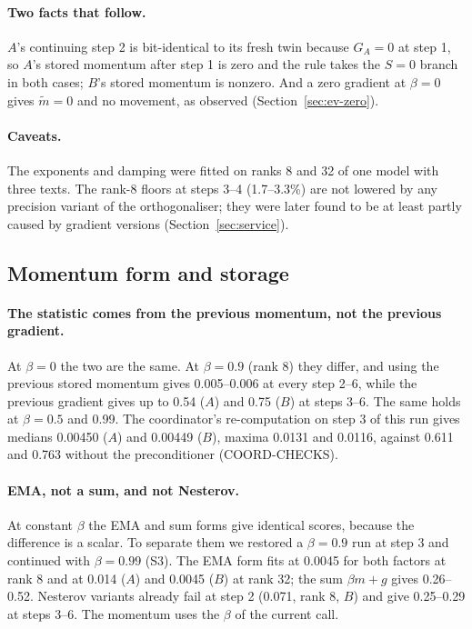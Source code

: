 \documentclass[11pt]{article}
\begin{document}
\paragraph{Two facts that follow.} $A$'s continuing step 2 is bit-identical to its fresh twin
because $G_A=0$ at step 1, so $A$'s stored momentum after step 1 is zero and the rule takes the
$S=0$ branch in both cases; $B$'s stored momentum is nonzero. And a zero gradient at $\beta=0$ gives
$\tilde m=0$ and no movement, as observed (Section~\ref{sec:ev-zero}).

\paragraph{Caveats.} The exponents and damping were fitted on ranks 8 and 32 of one model with three
texts. The rank-8 floors at steps 3--4 (1.7--3.3\%) are not lowered by any precision variant of the
orthogonaliser; they were later found to be at least partly caused by gradient versions
(Section~\ref{sec:service}).

\subsection{Momentum form and storage}\label{sec:ev-mom}
\paragraph{The statistic comes from the previous momentum, not the previous gradient.} At
$\beta=0$ the two are the same. At $\beta=0.9$ (rank 8) they differ, and using the previous stored
momentum gives 0.005--0.006 at every step 2--6, while the previous gradient gives up to 0.54 ($A$)
and 0.75 ($B$) at steps 3--6. The same holds at $\beta=0.5$ and 0.99. The coordinator's
re-computation on step 3 of this run gives medians 0.00450 ($A$) and 0.00449 ($B$), maxima 0.0131 and
0.0116, against 0.611 and 0.763 without the preconditioner (COORD-CHECKS).

\paragraph{EMA, not a sum, and not Nesterov.} At constant $\beta$ the EMA and sum forms give
identical scores, because the difference is a scalar. To separate them we restored a $\beta=0.9$ run
at step 3 and continued with $\beta=0.99$ (S3). The EMA form fits at 0.0045 for both factors at rank
8 and at 0.014 ($A$) and 0.0045 ($B$) at rank 32; the sum $\beta m+g$ gives 0.26--0.52. Nesterov
variants already fail at step 2 (0.071, rank 8, $B$) and give 0.25--0.29 at steps 3--6. The
momentum uses the $\beta$ of the current call.
\end{document}
